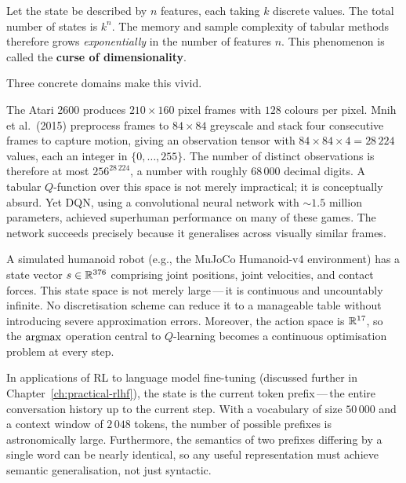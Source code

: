 \begin{definition}
\label{def:curse-dim}
Let the state be described by $n$ features, each taking $k$ discrete values.  The total number of
states is $k^n$.  The memory and sample complexity of tabular methods therefore grows
\emph{exponentially} in the number of features $n$.  This phenomenon is called the
\textbf{curse of dimensionality}.
\end{definition}

Three concrete domains make this vivid.

\begin{example}
\label{ex:atari-states}
The Atari 2600 produces $210 \times 160$ pixel frames with $128$ colours per pixel.  Mnih
et al.~(2015) preprocess frames to $84 \times 84$ greyscale and stack four consecutive frames to
capture motion, giving an observation tensor with $84 \times 84 \times 4 = 28\,224$ values, each
an integer in $\{0, \ldots, 255\}$.  The number of distinct observations is therefore at most
$256^{28\,224}$, a number with roughly $68\,000$ decimal digits.  A tabular $Q$-function over
this space is not merely impractical; it is conceptually absurd.  Yet DQN, using a convolutional
neural network with $\sim 1.5$ million parameters, achieved superhuman performance on many of these
games.  The network succeeds precisely because it generalises across visually similar frames.
\end{example}

\begin{example}
\label{ex:robotics-states}
A simulated humanoid robot (e.g., the MuJoCo Humanoid-v4 environment) has a state vector
$s \in \mathbb{R}^{376}$ comprising joint positions, joint velocities, and contact forces.  This state
space is not merely large\,---\,it is continuous and uncountably infinite.  No discretisation
scheme can reduce it to a manageable table without introducing severe approximation errors.
Moreover, the action space is $\mathbb{R}^{17}$, so the $\operatorname*{argmax}$ operation central to $Q$-learning
becomes a continuous optimisation problem at every step.
\end{example}

\begin{example}
\label{ex:language-states}
In applications of RL to language model fine-tuning (discussed further in
Chapter~\ref{ch:practical-rlhf}), the state is the current token prefix\,---\,the entire
conversation history up to the current step.  With a vocabulary of size $50\,000$ and a context
window of $2\,048$ tokens, the number of possible prefixes is astronomically large.  Furthermore,
the semantics of two prefixes differing by a single word can be nearly identical, so any useful
representation must achieve semantic generalisation, not just syntactic.
\end{example}

